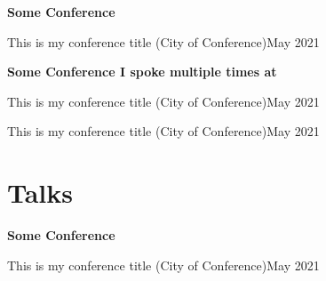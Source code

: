 \documentclass[margin,line]{res}
\newenvironment{list-talks}{
  \begin{list}{}{
      \setlength{\itemsep}{0.1in}
      \setlength{\parsep}{0in} 
      \setlength{\parskip}{0in}
      \setlength{\topsep}{0in} 
      \setlength{\partopsep}{0in} 
      \setlength{\rightmargin}{0in}
      \setlength{\leftmargin}{0in}
      }}{\end{list}
  }
\newenvironment{bullet-italic-no-right-stop}{
  \begin{list}{$\bullet$}{
      \setlength{\itemsep}{0.02in}
      \setlength{\parsep}{0in} 
      \setlength{\parskip}{0in}
      \setlength{\topsep}{0in} 
      \setlength{\partopsep}{0.025in} 
      \setlength{\rightmargin}{0in}
      \setlength{\leftmargin}{0.3in}
      \itshape
      }}{\end{list}
  }
\begin{document}
\begin{resume}
\begin{list-talks}
\item \textbf{Some Conference}  

\begin{bullet-italic-no-right-stop}
\item This is my conference title (City of Conference)\hfill{\textnormal{May 2021}}
\end{bullet-italic-no-right-stop}

\item \textbf{Some Conference I spoke multiple times at} 

\begin{bullet-italic-no-right-stop}
\item This is my conference title (City of Conference)\hfill{\textnormal{May 2021}}
\item This is my conference title (City of Conference)\hfill{\textnormal{May 2021}}
\end{bullet-italic-no-right-stop}

\end{list-talks}


\section{\sc Talks}

\begin{list-talks}

\item \textbf{Some Conference}  

\begin{bullet-italic-no-right-stop}
\item This is my conference title (City of Conference)\hfill{\textnormal{May 2021}}
\end{bullet-italic-no-right-stop}

\end{list-talks}

\end{resume}

\newpage

\pagestyle{headings}
\end{document}
